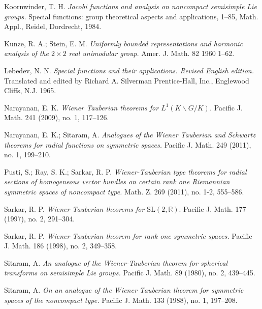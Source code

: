 \documentclass[11pt,reqno]{amsart}
\newcommand{\R}{\mathbb R}%
\theoremstyle{definition}
\theoremstyle{definition}
\numberwithin{equation}{section}
\begin{document}
\begin{thebibliography}{99}
 Koornwinder, T. H. {\em Jacobi functions and analysis on noncompact semisimple Lie groups.} Special functions: group theoretical aspects and applications, 1--85, Math. Appl., Reidel, Dordrecht, 1984.

 Kunze, R. A.; Stein, E. M. {\em Uniformly bounded representations and harmonic analysis of the $2\times 2$ real unimodular group}. Amer. J. Math. 82 1960 1--62. 

  Lebedev, N. N. {\em Special functions and their applications. Revised English edition.} Translated and edited by Richard A. Silverman Prentice-Hall, Inc., Englewood Cliffs, N.J. 1965.

 Narayanan, E. K. {\em Wiener Tauberian theorems for $L^1(K\backslash G/K)$.}  Pacific J. Math. 241 (2009), no. 1, 117--126.

  Narayanan, E. K.; Sitaram, A. {\em Analogues of the Wiener Tauberian and Schwartz theorems for radial functions on symmetric spaces.} Pacific J. Math. 249 (2011), no. 1, 199--210. 

 Pusti, S.; Ray, S. K.; Sarkar, R. P. {\em Wiener-Tauberian type theorems for radial sections of homogeneous vector bundles on certain rank one Riemannian symmetric spaces of noncompact type.} Math. Z. 269 (2011), no. 1-2, 555--586.

 Sarkar, R. P. {\em Wiener Tauberian theorems for $\mathrm{SL}(2, \R)$}. Pacific J. Math. 177 (1997), no. 2, 291--304.

 Sarkar, R. P. {\em Wiener Tauberian theorem for rank one symmetric spaces.} Pacific J. Math. 186 (1998), no. 2, 349--358. 

  Sitaram, A. {\em  An analogue of the Wiener-Tauberian theorem for spherical transforms on semisimple Lie groups.} Pacific J. Math. 89 (1980), no. 2, 439--445.

 Sitaram, A. {\em On an analogue of the Wiener Tauberian theorem for symmetric spaces of the noncompact type.} Pacific J. Math. 133 (1988), no. 1, 197--208. 



\end{thebibliography}
\end{document}
